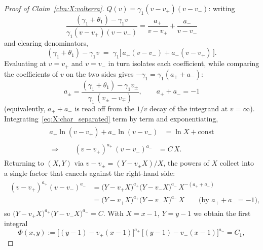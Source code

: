 \begin{proof}[Proof of Claim~\ref{clm:X:volterra}]
$Q(v)=\gamma_1(v-v_+)(v-v_-)$: writing
\begin{equation*}
    \frac{(\gamma_1+\theta_1)-\gamma_1 v}{\gamma_1(v-v_+)(v-v_-)}
    = \frac{a_+}{v-v_+} + \frac{a_-}{v-v_-}
\end{equation*}
and clearing denominators,
\begin{equation}
    (\gamma_1+\theta_1)-\gamma_1 v
    \;=\; \gamma_1\bigl[\,a_+(v-v_-)+a_-(v-v_+)\,\bigr].
    \nonumber
\end{equation}
Evaluating at $v=v_+$ and $v=v_-$ in turn isolates each coefficient, while comparing
the coefficients of $v$ on the two sides gives $-\gamma_1=\gamma_1(a_++a_-)$:
\begin{equation}
    a_{\pm}=\frac{(\gamma_1+\theta_1)-\gamma_1 v_{\pm}}{\gamma_1\,(v_{\pm}-v_{\mp})},
    \qquad a_++a_-=-1
    \label{eq:X:apm}
\end{equation}
(equivalently, $a_++a_-$ is read off from the $1/v$ decay of the integrand at
$v=\infty$). Integrating~\eqref{eq:X:char_separated} term by term and exponentiating,
\begin{align}
    \begin{split}
        a_+\ln(v-v_+)+a_-\ln(v-v_-) &= \ln X+\mathrm{const}
    \end{split}
    \nonumber\\[2pt]
    \begin{split}
        \Longrightarrow\qquad
        (v-v_+)^{a_+}\,(v-v_-)^{a_-} &= C\,X .
    \end{split}
    \nonumber
\end{align}
Returning to $(X,Y)$ via $v-v_\pm=(Y-v_\pm X)/X$, the powers of $X$ collect into a
single factor that cancels against the right-hand side:
\begin{align}
    \begin{split}
        (v-v_+)^{a_+}(v-v_-)^{a_-}
        &= \bigl(Y-v_+X\bigr)^{a_+}\bigl(Y-v_-X\bigr)^{a_-}\,X^{-(a_++a_-)} \\
        &= \bigl(Y-v_+X\bigr)^{a_+}\bigl(Y-v_-X\bigr)^{a_-}\,X
        \qquad\text{(by } a_++a_-=-1\text{)},
    \end{split}
    \nonumber
\end{align}
so $\bigl(Y-v_+X\bigr)^{a_+}\bigl(Y-v_-X\bigr)^{a_-}=C$. With $X=x-1$, $Y=y-1$ we
obtain the first integral
\begin{equation}
    \Phi(x,y)
    := \bigl[(y-1)-v_+(x-1)\bigr]^{a_+}\,\bigl[(y-1)-v_-(x-1)\bigr]^{a_-}
    = C_1,
    \label{eq:X:first_integral}
\end{equation}

\end{proof}
